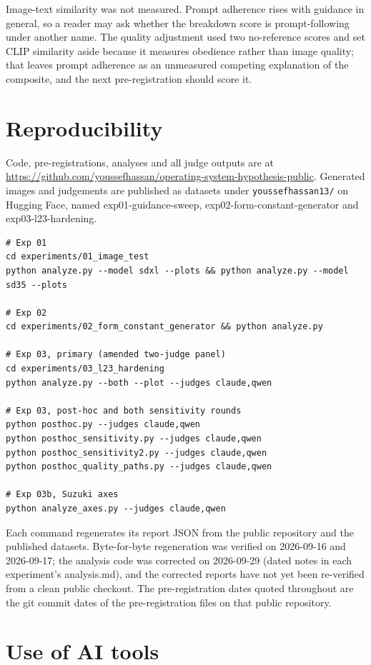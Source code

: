 \documentclass[11pt]{article}
\begin{document}
Image-text similarity was not measured. Prompt adherence rises with guidance in
general, so a reader may ask whether the breakdown score is prompt-following
under another name. The quality adjustment used two no-reference scores and set
CLIP similarity aside because it measures obedience rather than image quality;
that leaves prompt adherence as an unmeasured competing explanation of the
composite, and the next pre-registration should score it.

\section{Reproducibility}\label{reproducibility-1}

Code, pre-registrations, analyses and all judge outputs are at
\url{https://github.com/youssefhassan/operating-system-hypothesis-public}.
Generated images and judgements are published as datasets under
\texttt{youssefhassan13/} on Hugging Face, named exp01-guidance-sweep,
exp02-form-constant-generator and exp03-l23-hardening.

\begin{verbatim}
# Exp 01
cd experiments/01_image_test
python analyze.py --model sdxl --plots && python analyze.py --model sd35 --plots

# Exp 02
cd experiments/02_form_constant_generator && python analyze.py

# Exp 03, primary (amended two-judge panel)
cd experiments/03_l23_hardening
python analyze.py --both --plot --judges claude,qwen

# Exp 03, post-hoc and both sensitivity rounds
python posthoc.py --judges claude,qwen
python posthoc_sensitivity.py --judges claude,qwen
python posthoc_sensitivity2.py --judges claude,qwen
python posthoc_quality_paths.py --judges claude,qwen

# Exp 03b, Suzuki axes
python analyze_axes.py --judges claude,qwen
\end{verbatim}

Each command regenerates its report JSON from the public repository and the
published datasets. Byte-for-byte regeneration was verified on 2026-09-16 and
2026-09-17; the analysis code was corrected on 2026-09-29 (dated notes in each
experiment's analysis.md), and the corrected reports have not yet been
re-verified from a clean public checkout. The pre-registration dates quoted
throughout are the git commit dates of the pre-registration files on that public
repository.

\section{Use of AI tools}\label{use-of-ai-tools}
\end{document}

